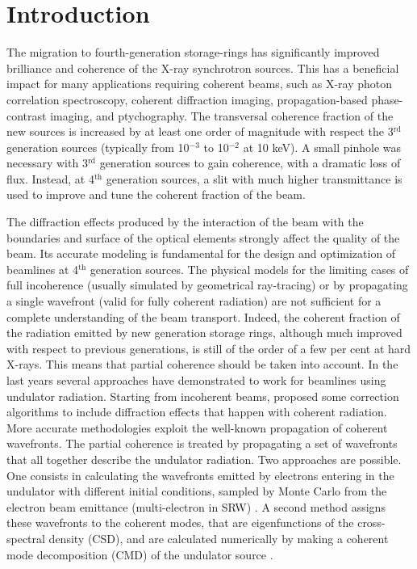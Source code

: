 \documentclass{iucr}              %
\begin{document}
\section{Introduction}
\label{sec:introduction}

The migration to fourth-generation storage-rings has significantly improved brilliance and coherence of the X-ray synchrotron sources. This has a beneficial impact for many applications requiring coherent beams, such as X-ray photon correlation spectroscopy, coherent diffraction imaging, propagation-based phase-contrast imaging, and ptychography.
The transversal coherence fraction of the new sources is increased by at least one order of magnitude with respect the 3$^{\text{rd}}$ generation sources (typically from 10$^{-3}$ to 10$^{-2}$ at 10 keV). A small pinhole was necessary with 3$^{\text{rd}}$ generation sources to gain coherence, with a dramatic loss of flux. Instead, at 4$^{\text{th}}$ generation sources, a slit with much higher transmittance is used to improve and tune the coherent fraction of the beam. 

The diffraction effects produced by the interaction of the beam with the boundaries and surface of the optical elements strongly affect the quality of the beam. Its accurate modeling is fundamental for the design and optimization of beamlines at 4$^{\text{th}}$ generation sources. The physical models for the limiting cases of full incoherence (usually simulated by geometrical ray-tracing) or by propagating a single wavefront (valid for fully coherent radiation) are not sufficient for a complete understanding of the beam transport. Indeed, the coherent fraction of the radiation emitted by new generation storage rings, although much improved with respect to previous generations, is still of the order of a few per cent at hard X-rays. This means that partial coherence should be taken into account. In the last years several approaches have demonstrated to work for beamlines using undulator radiation. Starting from incoherent beams,  proposed some correction algorithms to include diffraction effects that happen with coherent radiation. More accurate methodologies exploit the well-known propagation of coherent wavefronts. The partial coherence is treated by propagating a set of wavefronts that all together describe the undulator radiation. Two approaches are possible. One consists in calculating the wavefronts emitted by electrons entering in the undulator with different initial conditions, sampled by Monte Carlo from the electron beam emittance (multi-electron in SRW) \cite{codeSRW_ME}. A second method assigns these wavefronts to the coherent modes, that are eigenfunctions of the cross-spectral density (CSD), and are calculated numerically by making a coherent mode decomposition (CMD) of the undulator source \cite{codeCOMSYL}.  
\end{document}
